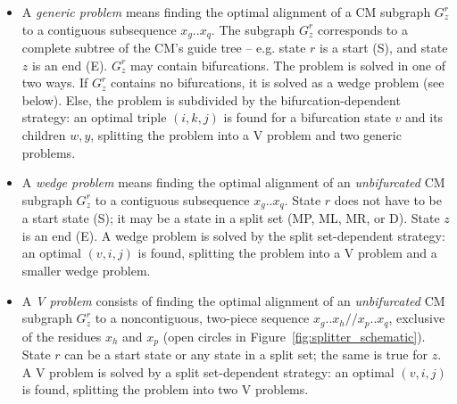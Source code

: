 \documentclass[11pt]{article}
\newif\ifdraft
\begin{document}
\begin{itemize}
\item A \emph{generic problem} means finding the optimal alignment of
a CM subgraph $G^r_z$ to a contiguous subsequence $x_g..x_q$. The
subgraph $G^r_z$ corresponds to a complete subtree of the CM's
guide tree -- e.g. state $r$ is a start (S), and state $z$ is an end
(E). $G^r_z$ may contain bifurcations. The problem is solved in one
of two ways. If $G^r_z$ contains no bifurcations, it is solved as a
wedge problem (see below). Else, the problem is subdivided by the
bifurcation-dependent strategy: an optimal triple $(i,k,j)$ is found
for a bifurcation state $v$ and its children $w,y$, splitting the
problem into a V problem and two generic problems.

\item A \emph{wedge problem} means finding the optimal alignment of an
\emph{unbifurcated} CM subgraph $G^r_z$ to a contiguous subsequence
$x_g..x_q$. State $r$ does not have to be a start state (S); it may be
a state in a split set (MP, ML, MR, or D). State $z$ is an end (E).  A
wedge problem is solved by the split set-dependent strategy: an
optimal $(v,i,j)$ is found, splitting the problem into a V problem and
a smaller wedge problem.

\item A \emph{V problem} consists of finding the optimal alignment of
an \emph{unbifurcated} CM subgraph $G^r_z$ to a noncontiguous,
two-piece sequence $x_g..x_h//x_p..x_q$, exclusive of the residues
$x_h$ and $x_p$ (open circles in Figure~\ref{fig:splitter_schematic}).
State $r$ can be a start state or any state in a split set; the same
is true for $z$. A V problem is solved by a split set-dependent
strategy: an optimal $(v,i,j)$ is found, splitting the problem into
two V problems.
\end{itemize}

\ifdraft
\begin{figure}
\begin{center}
\texttt{[image: Figures/splitter\_schematic]}
\end{center}
\caption{\textbf{The three types of problems that need to be split.}
The sequence axis (e.g. $x_g..x_q$) is horizontal. The model subgraph
axis for a contiguous set of states (e.g. states $r..z$) is vertical,
where a solid lines means an unbifurcated model subgraph, and a dashed
line means a model subgraph that may contain bifurcations.  Closed
circles indicate ``inclusive of'', and open circles indicate
``exclusive of''.}
\label{fig:splitter_schematic}
\end{figure}
\fi
\end{document}
